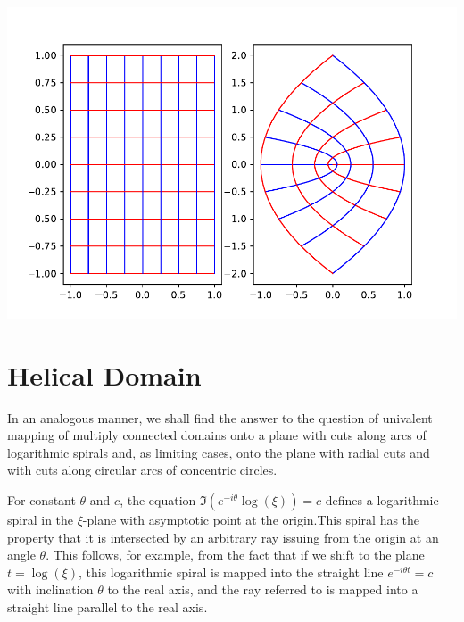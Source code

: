 \documentclass[
]{book}
\theoremstyle{definition}
\theoremstyle{definition}
\theoremstyle{definition}
\theoremstyle{definition}
\theoremstyle{remark}
\begin{document}
\includegraphics{ConformalMapping_files/figure-latex/unnamed-chunk-48-1.pdf}

\chapter{Helical Domain}\label{helical-domain}

In an analogous manner, we shall find the answer to the question of univalent mapping of multiply connected domains onto a plane with cuts along arcs of logarithmic spirals and, as limiting cases, onto the plane with radial cuts and with cuts along circular arcs of concentric circles.

For constant \(\theta\) and \(c\), the equation \(\Im(e^{-i\theta}\log(\xi))=c\) defines a logarithmic spiral in the \(\xi\)-plane with asymptotic point at the origin.This spiral has the property that it is intersected by an arbitrary ray issuing from the origin at an angle \(\theta\). This follows, for example, from the fact that if we shift to the plane \(t = \log(\xi)\), this logarithmic spiral is mapped into the straight line \(e^{-i\theta t} = c\) with inclination \(\theta\) to the real axis, and the ray referred to is mapped into a straight line parallel to the real axis.
\end{document}
